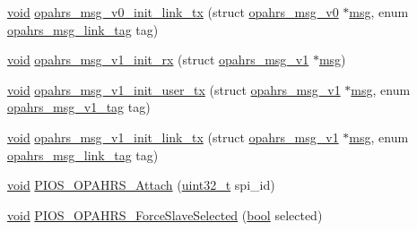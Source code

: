 \begin{DoxyCompactItemize}
\item 
\hyperlink{group___n_a_m_e_ga18028b8badbf1ea7e704ccac3c488e82}{void} \hyperlink{group___p_i_o_s___o_p_a_h_r_s_ga43f50d3713d9dceceaf9d3780287fe88}{opahrs\-\_\-msg\-\_\-v0\-\_\-init\-\_\-link\-\_\-tx} (struct \hyperlink{structopahrs__msg__v0}{opahrs\-\_\-msg\-\_\-v0} $\ast$\hyperlink{group___o_s_d_module_ga31fe24ba18a63ea1e8cdb622e7ece509}{msg}, enum \hyperlink{group___p_i_o_s___o_p_a_h_r_s_ga8973c96ae9d6e7d40e63cb2bf0a78a79}{opahrs\-\_\-msg\-\_\-link\-\_\-tag} tag)
\item 
\hyperlink{group___n_a_m_e_ga18028b8badbf1ea7e704ccac3c488e82}{void} \hyperlink{group___p_i_o_s___o_p_a_h_r_s_ga08d1c5261d3a4706138142153d846213}{opahrs\-\_\-msg\-\_\-v1\-\_\-init\-\_\-rx} (struct \hyperlink{structopahrs__msg__v1}{opahrs\-\_\-msg\-\_\-v1} $\ast$\hyperlink{group___o_s_d_module_ga31fe24ba18a63ea1e8cdb622e7ece509}{msg})
\item 
\hyperlink{group___n_a_m_e_ga18028b8badbf1ea7e704ccac3c488e82}{void} \hyperlink{group___p_i_o_s___o_p_a_h_r_s_ga70da8f1c439493852fd33d8463e58637}{opahrs\-\_\-msg\-\_\-v1\-\_\-init\-\_\-user\-\_\-tx} (struct \hyperlink{structopahrs__msg__v1}{opahrs\-\_\-msg\-\_\-v1} $\ast$\hyperlink{group___o_s_d_module_ga31fe24ba18a63ea1e8cdb622e7ece509}{msg}, enum \hyperlink{group___p_i_o_s___o_p_a_h_r_s_ga83fcba837e9aa83c34680ef159f5dec7}{opahrs\-\_\-msg\-\_\-v1\-\_\-tag} tag)
\item 
\hyperlink{group___n_a_m_e_ga18028b8badbf1ea7e704ccac3c488e82}{void} \hyperlink{group___p_i_o_s___o_p_a_h_r_s_gadb8b1168214cb2379c70480c4e24fff9}{opahrs\-\_\-msg\-\_\-v1\-\_\-init\-\_\-link\-\_\-tx} (struct \hyperlink{structopahrs__msg__v1}{opahrs\-\_\-msg\-\_\-v1} $\ast$\hyperlink{group___o_s_d_module_ga31fe24ba18a63ea1e8cdb622e7ece509}{msg}, enum \hyperlink{group___p_i_o_s___o_p_a_h_r_s_ga8973c96ae9d6e7d40e63cb2bf0a78a79}{opahrs\-\_\-msg\-\_\-link\-\_\-tag} tag)
\item 
\hyperlink{group___n_a_m_e_ga18028b8badbf1ea7e704ccac3c488e82}{void} \hyperlink{group___p_i_o_s___o_p_a_h_r_s_ga3c5db99dda75d50cdb2d79fdb13ab50a}{P\-I\-O\-S\-\_\-\-O\-P\-A\-H\-R\-S\-\_\-\-Attach} (\hyperlink{stdint_8h_a435d1572bf3f880d55459d9805097f62}{uint32\-\_\-t} spi\-\_\-id)
\item 
\hyperlink{group___n_a_m_e_ga18028b8badbf1ea7e704ccac3c488e82}{void} \hyperlink{group___p_i_o_s___o_p_a_h_r_s_ga2ce9aa363884ac4a0e00d1b984779379}{P\-I\-O\-S\-\_\-\-O\-P\-A\-H\-R\-S\-\_\-\-Force\-Slave\-Selected} (\hyperlink{group___exported__types_gaf6a258d8f3ee5206d682d799316314b1}{bool} selected)

\end{DoxyCompactItemize}

